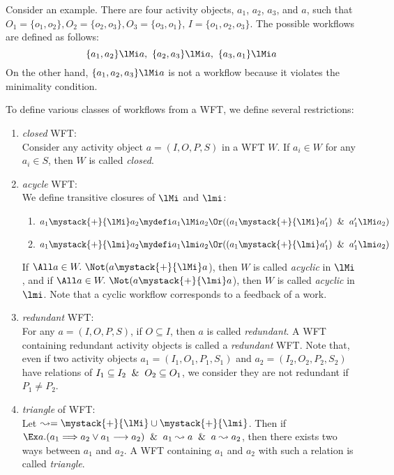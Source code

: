 Consider an example.
There are four activity objects, $a_1$, $a_2$, $a_3$, and $a$, such that
$O_1=\{o_1,o_2\}, O_2=\{o_2,o_3\}, O_3=\{o_3,o_1\}$, $I=\{o_1,o_2,o_3\}$.
The possible workflows are defined as follows:
\[\{a_1,a_2\}\lMi a,\ \{a_2,a_3\}\lMi a,\ \{a_3,a_1\}\lMi a\]
On the other hand, $\{a_1,a_2,a_3\}\lMi a$ is not a workflow because it 
violates the minimality condition.

To define various classes of workflows from a WFT, 
we define several restrictions:
\begin{enumerate}
\item {\em closed} WFT:\\
Consider any activity object $a=(I,O,P,S)$ in a WFT $W$.
If $a_i\in W$ for any $a_i\in S$, then $W$ is called {\em closed}.

\item {\em acycle} WFT:\\
We define transitive closures of $\lMi$ and $\lmi$:
\begin{enumerate}
\item $a_1\mystack{+}{\lMi}a_2\mydefi 
	a_1\lMi a_2\Or((a_1\mystack{+}{\lMi}a_1')\And a_1'\lMi a_2)$
\item $a_1\mystack{+}{\lmi}a_2\mydefi 
	a_1\lmi a_2\Or((a_1\mystack{+}{\lmi}a_1')\And a_1'\lmi a_2)$
\end{enumerate}

If $\All a\in W.\ \Not (a\mystack{+}{\lMi}a$), 
then $W$ is called {\em acyclic} in $\lMi$, and
if $\All a\in W.\ \Not (a\mystack{+}{\lmi}a$), 
then $W$ is called {\em acyclic} in $\lmi$.
Note that a cyclic workflow corresponds to a feedback of a work.

\item {\em redundant} WFT:\\
      For any $a=(I,O,P,S)$, if $O\subseteq I$, then $a$ is called {\em
      redundant}.  A WFT containing redundant activity objects is called
      a {\em redundant} WFT.  Note that, even if two activity objects
      $a_1=(I_1,O_1,P_1,S_1)$ and $a_2=(I_2,O_2,P_2,S_2)$ have
      relations of $I_1\subseteq I_2\And O_2\subseteq O_1$, we consider
      they are not redundant if $P_1\neq P_2$.

\item {\em triangle} of WFT:\\
      Let $\leadsto=\mystack{+}{\lMi}\cup\mystack{+}{\lmi}$.
      Then if $\Ex a. (a_1\Longrightarrow a_2 \vee a_1 \longrightarrow a_2)
      \And a_1\leadsto a \And a\leadsto a_2$,
      then there exists two ways between $a_1$ and $a_2$.  A WFT
      containing $a_1$ and $a_2$ with such a relation is called {\em
      triangle}.
\end{enumerate}

